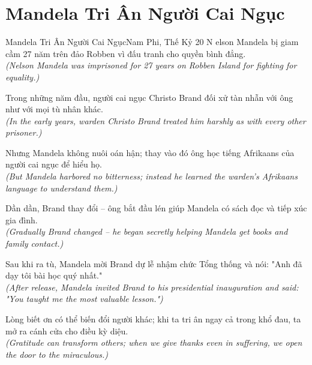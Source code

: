 \section{Mandela Tri Ân Người Cai Ngục}
\begin{truyen}{Mandela Tri Ân Người Cai Ngục}{Nam Phi, Thế Kỷ 20}
N elson Mandela bị giam cầm 27 năm trên đảo Robben vì đấu tranh cho quyền bình đẳng.\\
\textit{(Nelson Mandela was imprisoned for 27 years on Robben Island for fighting for equality.)}

Trong những năm đầu, người cai ngục Christo Brand đối xử tàn nhẫn với ông như với mọi tù nhân khác.\\
\textit{(In the early years, warden Christo Brand treated him harshly as with every other prisoner.)}

Nhưng Mandela không nuôi oán hận; thay vào đó ông học tiếng Afrikaans của người cai ngục để hiểu họ.\\
\textit{(But Mandela harbored no bitterness; instead he learned the warden's Afrikaans language to understand them.)}

Dần dần, Brand thay đổi -- ông bắt đầu lén giúp Mandela có sách đọc và tiếp xúc gia đình.\\
\textit{(Gradually Brand changed -- he began secretly helping Mandela get books and family contact.)}

Sau khi ra tù, Mandela mời Brand dự lễ nhậm chức Tổng thống và nói: "Anh đã dạy tôi bài học quý nhất."\\
\textit{(After release, Mandela invited Brand to his presidential inauguration and said: "You taught me the most valuable lesson.")}

\end{truyen}
\begin{baihoc}
  Lòng biết ơn có thể biến đổi người khác; khi ta tri ân ngay cả trong khổ đau, ta mở ra cánh cửa cho điều kỳ diệu.\\
  \textit{(Gratitude can transform others; when we give thanks even in suffering, we open the door to the miraculous.)}
\end{baihoc}

